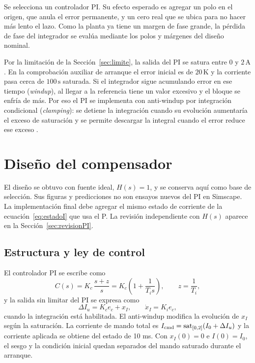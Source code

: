 \documentclass[journal,twocolumn]{IEEEtran}
\begin{document}
Se selecciona un controlador PI. Su efecto esperado es agregar un polo en el origen, que anula el error permanente, y un cero real que se ubica para no hacer más lento el lazo. Como la planta ya tiene un margen de fase grande, la pérdida de fase del integrador se evalúa mediante los polos y márgenes del diseño nominal.

Por la limitación de la Sección~\ref{sec:limite}, la salida del PI se satura entre $0$ y $2\,\mathrm A$. En la comprobación auxiliar de arranque el error inicial es de $20\,\mathrm K$ y la corriente pasa cerca de $100\,\mathrm s$ saturada. Si el integrador sigue acumulando error en ese tiempo (\emph{windup}), al llegar a la referencia tiene un valor excesivo y el bloque se enfría de más. Por eso el PI se implementa con anti-windup por integración condicional (\emph{clamping}): se detiene la integración cuando su evolución aumentaría el exceso de saturación y se permite descargar la integral cuando el error reduce ese exceso \cite{astrom,mw_pid}.

\section{Diseño del compensador}\label{sec:diseno}
El diseño se obtuvo con fuente ideal, $H(s)=1$, y se conserva aquí como base de selección. Sus figuras y predicciones no son ensayos nuevos del PI en Simscape. La implementación final debe agregar el mismo estado de corriente de la ecuación~\eqref{eq:estadoI} que usa el P. La revisión independiente con $H(s)$ aparece en la Sección~\ref{sec:revisionPI}.
\subsection{Estructura y ley de control}
El controlador PI se escribe como
\begin{equation}
C(s)=K_c\,\frac{s+z}{s}=K_c\left(1+\frac{1}{T_is}\right),\qquad z=\frac{1}{T_i},\label{eq:PI}
\end{equation}
y la salida sin limitar del PI se expresa como
\begin{equation}
\Delta I_u=K_ce_c+x_I,\qquad \dot x_I=K_ie_c,\label{eq:ley}
\end{equation}
cuando la integración está habilitada. El anti-windup modifica la evolución de $x_I$ según la saturación. La corriente de mando total es $I_{\rm cmd}=\operatorname{sat}_{[0,2]}(I_0+\Delta I_u)$ y la corriente aplicada se obtiene del estado de 10 ms. Con $x_I(0)=0$ e $I(0)=I_0$, el sesgo y la condición inicial quedan separados del mando saturado durante el arranque.
\end{document}
